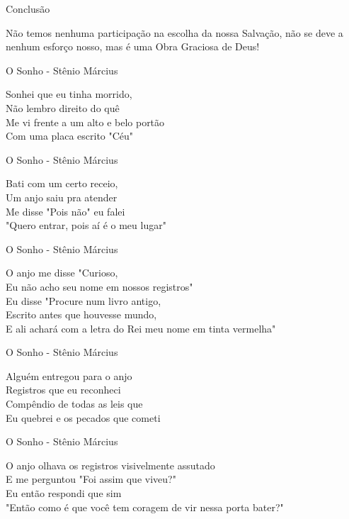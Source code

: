 \documentclass[compress]{beamer}
\begin{document}
\begin{frame}{Conclusão}

{\Huge Não temos nenhuma participação na escolha da nossa Salvação, não se deve a nenhum esforço nosso, mas é uma Obra Graciosa de Deus!}
\end{frame}

\begin{frame}{O Sonho - Stênio Március}

\huge Sonhei que eu tinha morrido,\\
Não lembro direito do quê\\
Me vi frente a um alto e belo portão\\
Com uma placa escrito "Céu"
\end{frame}

\begin{frame}{O Sonho - Stênio Március}

\huge Bati com um certo receio,\\
Um anjo saiu pra atender\\
Me disse "Pois não" eu falei\\ 
"Quero entrar, pois aí é o meu lugar"
\end{frame}

\begin{frame}{O Sonho - Stênio Március}

\huge O anjo me disse "Curioso,\\ 
Eu não acho seu nome em nossos registros"\\
Eu disse "Procure num livro antigo,\\ 
Escrito antes que houvesse mundo,\\
E ali achará com a letra do Rei meu nome em tinta vermelha"
\end{frame}

\begin{frame}{O Sonho - Stênio Március}

\huge Alguém entregou para o anjo\\ 
Registros que eu reconheci\\
Compêndio de todas as leis que\\ 
Eu quebrei e os pecados que cometi
\end{frame}

\begin{frame}{O Sonho - Stênio Március}

\huge O anjo olhava os registros visivelmente assutado\\
E me perguntou "Foi assim que viveu?" \\
Eu então respondi que sim\\
"Então como é que você tem coragem de vir nessa porta bater?"
\end{frame}
\end{document}
